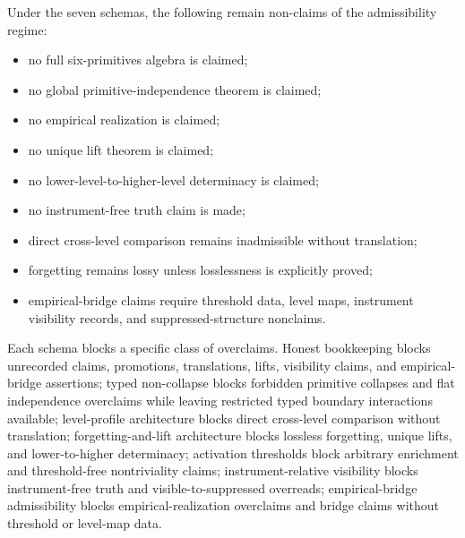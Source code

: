 \begin{proposition}\label{prop:nonclaim-closure}
Under the seven schemas, the following remain non-claims of the
admissibility regime:
\begin{itemize}[topsep=2pt,itemsep=1pt]
  \item no full six-primitives algebra is claimed;
  \item no global primitive-independence theorem is claimed;
  \item no empirical realization is claimed;
  \item no unique lift theorem is claimed;
  \item no lower-level-to-higher-level determinacy is claimed;
  \item no instrument-free truth claim is made;
  \item direct cross-level comparison remains inadmissible without
    translation;
  \item forgetting remains lossy unless losslessness is explicitly proved;
  \item empirical-bridge claims require threshold data, level maps,
    instrument visibility records, and suppressed-structure nonclaims.
\end{itemize}
Each schema blocks a specific class of overclaims. Honest bookkeeping blocks
unrecorded claims, promotions, translations, lifts, visibility claims, and
empirical-bridge assertions; typed non-collapse blocks forbidden primitive
collapses and flat independence overclaims while leaving restricted typed
boundary interactions available; level-profile architecture blocks direct
cross-level comparison without translation; forgetting-and-lift architecture
blocks lossless forgetting, unique lifts, and lower-to-higher determinacy;
activation thresholds block arbitrary enrichment and threshold-free
nontriviality claims; instrument-relative visibility blocks instrument-free
truth and visible-to-suppressed overreads; empirical-bridge admissibility
blocks empirical-realization overclaims and bridge claims without threshold or
level-map data.
\end{proposition}
